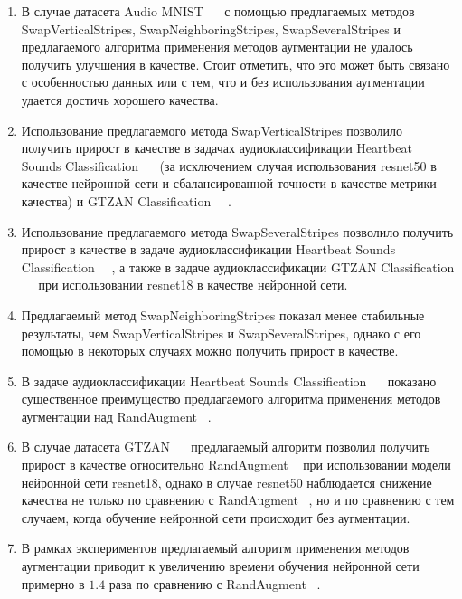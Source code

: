 \documentclass[12pt, fleqn]{article}
\begin{document}
\begin{enumerate}
    \item В случае датасета Audio MNIST ~\cite{AudioMnistArticle}~\cite{AudioMnistKaggle} с помощью предлагаемых методов SwapVerticalStripes, SwapNeighboringStripes, SwapSeveralStripes и предлагаемого алгоритма применения методов аугментации не удалось получить улучшения в качестве. Стоит отметить, что это может быть связано с особенностью данных или с тем, что и без использования аугментации удается достичь хорошего качества.
    \item Использование предлагаемого метода SwapVerticalStripes позволило получить прирост в качестве в задачах аудиоклассификации Heartbeat Sounds Classification
    ~\cite{HeartbeatSoundsArticle}~\cite{HeartbeatSoundsKaggle} (за исключением случая использования resnet50 в качестве нейронной сети и сбалансированной точности в качестве метрики качества) и GTZAN Classification ~\cite{GTZAN_Article}~\cite{GTZAN_kaggle}.
    \item Использование предлагаемого метода SwapSeveralStripes позволило получить прирост в качестве в задаче аудиоклассификации Heartbeat Sounds Classification
    ~\cite{HeartbeatSoundsArticle}~\cite{HeartbeatSoundsKaggle}, а также в задаче аудиоклассификации  GTZAN Classification ~\cite{GTZAN_Article}~\cite{GTZAN_kaggle} при использовании resnet18 в качестве нейронной сети.
    \item Предлагаемый метод SwapNeighboringStripes показал менее стабильные результаты, чем SwapVerticalStripes и SwapSeveralStripes, однако с его помощью в некоторых случаях можно получить прирост в качестве.
    \item В задаче аудиоклассификации Heartbeat Sounds Classification ~\cite{HeartbeatSoundsArticle}~\cite{HeartbeatSoundsKaggle} показано существенное преимущество предлагаемого алгоритма применения методов аугментации над RandAugment ~\cite{RandAugment}.
    \item В случае датасета GTZAN ~\cite{GTZAN_Article}~\cite{GTZAN_kaggle} предлагаемый алгоритм позволил получить прирост в качестве относительно RandAugment ~\cite{RandAugment} при использовании модели нейронной сети resnet18, однако в случае resnet50 наблюдается снижение качества не только по сравнению с RandAugment ~\cite{RandAugment}, но и по сравнению с тем случаем, когда обучение нейронной сети происходит без аугментации.
    \item В рамках экспериментов предлагаемый алгоритм применения методов аугментации приводит к увеличению времени обучения нейронной сети примерно в $1.4$ раза по сравнению с RandAugment ~\cite{RandAugment}.
\end{enumerate}
\end{document}
